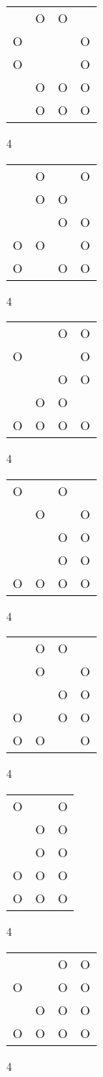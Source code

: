 \begin{tabular}{|m{0.2cm}m{0.2cm}m{0.2cm}m{0.2cm}|}\hline
 &O&O& \\
O& & &O\\
O& & &O\\
 &O&O&O\\
 &O&O&O\\
\hline\end{tabular}4
\begin{tabular}{|m{0.2cm}m{0.2cm}m{0.2cm}m{0.2cm}|}\hline
 &O& &O\\
 &O&O& \\
 & &O&O\\
O&O& &O\\
O& &O&O\\
\hline\end{tabular}4
\begin{tabular}{|m{0.2cm}m{0.2cm}m{0.2cm}m{0.2cm}|}\hline
 & &O&O\\
O& & &O\\
 & &O&O\\
 &O&O& \\
O&O&O&O\\
\hline\end{tabular}4
\begin{tabular}{|m{0.2cm}m{0.2cm}m{0.2cm}m{0.2cm}|}\hline
O& &O& \\
 &O& &O\\
 & &O&O\\
 & &O&O\\
O&O&O&O\\
\hline\end{tabular}4
\begin{tabular}{|m{0.2cm}m{0.2cm}m{0.2cm}m{0.2cm}|}\hline
 &O&O& \\
 &O& &O\\
 & &O&O\\
O& &O&O\\
O&O& &O\\
\hline\end{tabular}4
\begin{tabular}{|m{0.2cm}m{0.2cm}m{0.2cm}|}\hline
O& &O\\
 &O&O\\
 &O&O\\
O&O&O\\
O&O&O\\
\hline\end{tabular}4
\begin{tabular}{|m{0.2cm}m{0.2cm}m{0.2cm}m{0.2cm}|}\hline
 & &O&O\\
O& &O&O\\
 &O&O&O\\
O&O&O&O\\
\hline\end{tabular}4

